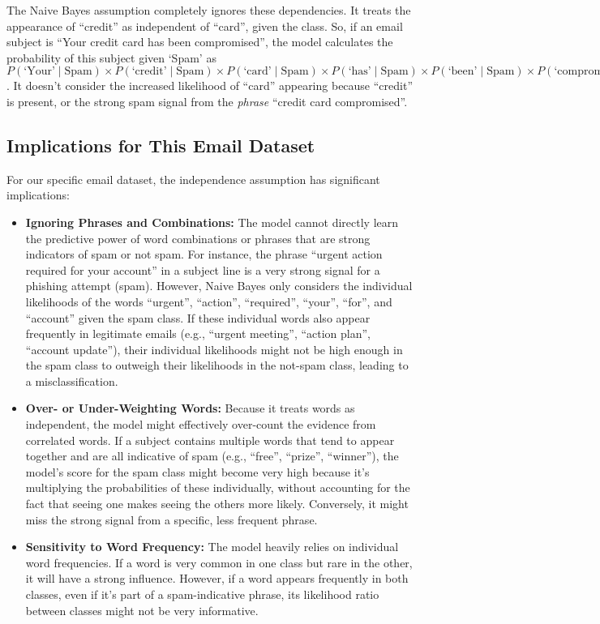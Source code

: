 \documentclass[12pt,letterpaper]{article}
\begin{document}
The Naive Bayes assumption completely ignores these dependencies. It treats the appearance of ``credit'' as independent of ``card'', given the class. So, if an email subject is ``Your credit card has been compromised'', the model calculates the probability of this subject given `Spam' as $P(\text{`Your'} \mid \text{Spam}) \times P(\text{`credit'} \mid \text{Spam}) \times P(\text{`card'} \mid \text{Spam}) \times P(\text{`has'} \mid \text{Spam}) \times P(\text{`been'} \mid \text{Spam}) \times P(\text{`compromised'} \mid \text{Spam})$. It doesn't consider the increased likelihood of ``card'' appearing because ``credit'' is present, or the strong spam signal from the \textit{phrase} ``credit card compromised''.

\subsection{Implications for This Email Dataset}

For our specific email dataset, the independence assumption has significant implications:

\begin{itemize}
    \item \textbf{Ignoring Phrases and Combinations:} The model cannot directly learn the predictive power of word combinations or phrases that are strong indicators of spam or not spam. For instance, the phrase ``urgent action required for your account'' in a subject line is a very strong signal for a phishing attempt (spam). However, Naive Bayes only considers the individual likelihoods of the words ``urgent'', ``action'', ``required'', ``your'', ``for'', and ``account'' given the spam class. If these individual words also appear frequently in legitimate emails (e.g., ``urgent meeting'', ``action plan'', ``account update''), their individual likelihoods might not be high enough in the spam class to outweigh their likelihoods in the not-spam class, leading to a misclassification.
    
    \item \textbf{Over- or Under-Weighting Words:} Because it treats words as independent, the model might effectively over-count the evidence from correlated words. If a subject contains multiple words that tend to appear together and are all indicative of spam (e.g., ``free'', ``prize'', ``winner''), the model's score for the spam class might become very high because it's multiplying the probabilities of these individually, without accounting for the fact that seeing one makes seeing the others more likely. Conversely, it might miss the strong signal from a specific, less frequent phrase.
    
    \item \textbf{Sensitivity to Word Frequency:} The model heavily relies on individual word frequencies. If a word is very common in one class but rare in the other, it will have a strong influence. However, if a word appears frequently in both classes, even if it's part of a spam-indicative phrase, its likelihood ratio between classes might not be very informative.
\end{itemize}
\end{document}
